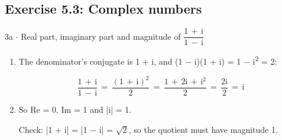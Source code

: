 \documentclass[11pt]{article}
\begin{document}
\begin{keepsection}\subsection{Exercise 5.3: Complex numbers}

\begin{workedbox}{3a \ensuremath{\cdot} Real part, imaginary part and magnitude of {\small\ensuremath{\dfrac{1\, +\, \mathrm{i}}{1\, -\, \mathrm{i}}}}}
\begin{enumerate}
\item {}
The denominator’s conjugate is 1 + i, and (1 \ensuremath{-} i)(1 + i) = 1 \ensuremath{-} i\textsuperscript{2} = 2:

\begin{equation*}\dfrac{1\, +\, \mathrm{i}}{1\, -\, \mathrm{i}}\, =\, \dfrac{(1\, +\, \mathrm{i})^{2}}{2}\, =\, \dfrac{1\, +\, 2\mathrm{i}\, +\, \mathrm{i}^{2}}{2}\, =\, \dfrac{2\mathrm{i}}{2}\, =\, \mathrm{i}\end{equation*}
\item {}
So Re = 0, Im = 1 and |i| = 1.

Check: |1 + i| = |1 \ensuremath{-} i| = \ensuremath{\sqrt{2}}, so the quotient must have magnitude 1.
\end{enumerate}
\end{workedbox}

\end{keepsection}
\end{document}
